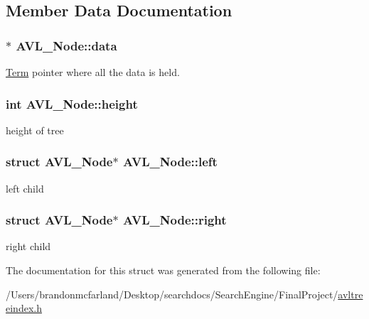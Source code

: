 \subsection{Member Data Documentation}
\hypertarget{struct_a_v_l___node_a6a9062cc45fa099a2c68763e1d52b894}{}
\subsubsection[{data}]{$\ast$ A\+V\+L\+\_\+\+Node\+::data}\label{struct_a_v_l___node_a6a9062cc45fa099a2c68763e1d52b894}


\hyperlink{class_term}{Term} pointer where all the data is held. 

\hypertarget{struct_a_v_l___node_a802b8e700879b7489730140f5e1fd121}{}
\subsubsection[{height}]{\setlength{\rightskip}{0pt plus 5cm}int A\+V\+L\+\_\+\+Node\+::height}\label{struct_a_v_l___node_a802b8e700879b7489730140f5e1fd121}


height of tree 

\hypertarget{struct_a_v_l___node_a7a5a4e3c99ef2c11b20a6a60aee247a8}{}
\subsubsection[{left}]{\setlength{\rightskip}{0pt plus 5cm}struct {\bf A\+V\+L\+\_\+\+Node}$\ast$ A\+V\+L\+\_\+\+Node\+::left}\label{struct_a_v_l___node_a7a5a4e3c99ef2c11b20a6a60aee247a8}


left child 

\hypertarget{struct_a_v_l___node_af0d0c4d5eaf62a9141711d1a10e3ba11}{}
\subsubsection[{right}]{\setlength{\rightskip}{0pt plus 5cm}struct {\bf A\+V\+L\+\_\+\+Node}$\ast$ A\+V\+L\+\_\+\+Node\+::right}\label{struct_a_v_l___node_af0d0c4d5eaf62a9141711d1a10e3ba11}


right child 



The documentation for this struct was generated from the following file\+:\begin{DoxyCompactItemize}
\item 
/\+Users/brandonmcfarland/\+Desktop/searchdocs/\+Search\+Engine/\+Final\+Project/\hyperlink{avltreeindex_8h}{avltreeindex.\+h}\end{DoxyCompactItemize}
